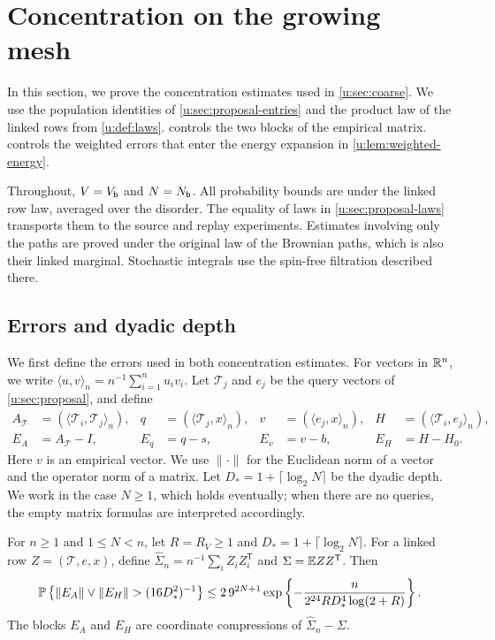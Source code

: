 \chapter{Concentration on the growing mesh}\label{u:sec:concentration}

In this section, we prove the concentration estimates used in
\cref{u:sec:coarse}. We use the population identities of
\cref{u:sec:proposal-entries} and the product law of the linked rows from
\cref{u:def:laws}.  controls the two blocks of the empirical
matrix.  controls the weighted errors that enter the
energy expansion in \cref{u:lem:weighted-energy}.

Throughout, $V=V_{\mathsf{b}}$ and $N=N_{\mathsf{b}}$. All probability bounds are
under the linked row law, averaged over the disorder. The equality of
laws in \cref{u:sec:proposal-laws} transports them to the source and
replay experiments. Estimates involving only the paths are proved under
the original law of the Brownian paths, which is also their linked marginal.
Stochastic integrals use the spin-free filtration described there.

\section{Errors and dyadic depth}\label{u:sec:gram}

We first define the errors used in both concentration estimates.
For vectors in $\mathbb R^n$, we write
$\langle u,v\rangle_n=n^{-1}\sum_{i=1}^n u_iv_i$.
Let $\mathcal T_j$ and $e_j$ be the query vectors of
\cref{u:sec:proposal}, and define
\begin{equation}\label{u:eq:empirical-errors}
\begin{aligned}
 A_{\mathcal T}&=(\langle\mathcal T_i,\mathcal T_j\rangle_n),
 &q&=(\langle\mathcal T_j,x\rangle_n),
 &v&=(\langle e_j,x\rangle_n),
 &H&=(\langle\mathcal T_i,e_j\rangle_n),\\
 E_A&=A_{\mathcal T}-I,
 &E_q&=q-s,
 &E_v&=v-b,
 &E_H&=H-H_0.
\end{aligned}
\end{equation}
Here $v$ is an empirical vector. We use $\|\cdot\|$ for the Euclidean
norm of a vector and the operator norm of a matrix. Let
$D_*=1+\lceil\log_2N\rceil$ be the dyadic depth. We work in the case
$N\ge1$, which holds eventually; when there are no queries, the empty
matrix formulas are interpreted accordingly.

\begin{lemma}\label{u:lem:gram}
For $n\ge1$ and $1\le N<n$, let $R=R_V\ge1$ and
$D_*=1+\lceil\log_2N\rceil$. For a linked row
$Z=(\mathcal T,e,x)$, define
$\widehat\Sigma_n=n^{-1}\sum_iZ_iZ_i^{\mathsf T}$ and
$\Sigma=\mathbb E ZZ^{\mathsf T}$. Then
\begin{equation}\label{u:eq:fixed-gram}
 \PP\left\{\|E_A\|\vee\|E_H\|>(16D_*^2)^{-1}\right\}
 \le 2\,9^{2N+1}
 \exp\left\{-\frac{n}{2^{24}RD_*^4\log(2+R)}\right\}.
\end{equation}
The blocks $E_A$ and $E_H$ are coordinate compressions of
$\widehat\Sigma_n-\Sigma$.
\end{lemma}

